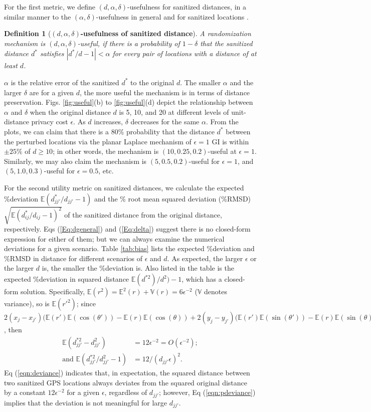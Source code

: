 \documentclass[10pt,journal,compsoc]{IEEEtran}
\newtheorem{defn}{Definition}
\newcommand{\E}{\mathbb{E}}
\newcommand{\V}{\mathbb{V}}
\begin{document}
For the first metric,  we define $(d,\alpha,\delta)$-usefulness for sanitized distances, in a similar manner   to the $(\alpha,\delta)$-usefulness in general \cite{blum} and for sanitized locations \cite{andres2013geo}.
\begin{defn}[\textbf{$(d,\alpha,\delta)$-usefulness of sanitized distance}] A randomization mechanism is $(d,\alpha,\delta)$-useful, if there is a probability of $1-\delta$ that  the sanitized distance $d^*$ satisfies $|d^*\!/d-1|<\alpha$ for every pair of locations with a distance of at least $d$.
\end{defn}\vspace{-3pt}
$\alpha$ is the relative error of the sanitized $d^*$ to the original $d$.  The smaller $\alpha$ and the larger $\delta$ are for a given $d$, the more useful the mechanism is in terms of distance preservation. Figs. \ref{fig:useful}(b) to \ref{fig:useful}(d) depict the relationship  between $\alpha$ and $\delta$ when the original distance $d$ is 5, 10, and 20 at different levels of unit-distance privacy cost $\epsilon$. As $d$ increases, $\delta$ decreases for the same $\alpha$. From the plots, we can claim that there is a 80\% probability that the distance $d^*$ between the perturbed locations via the planar Laplace mechanism of $\epsilon=1$ GI is within $\pm 25\%$ of $d\ge10$; in other words, the mechanism is $(10,  0.25, 0.2)$-useful at $\epsilon=1$. Similarly, we may also claim the mechanism is  $(5, 0.5, 0.2)$-useful for $\epsilon=1$, and $(5, 1.0, 0.3)$-useful for $\epsilon=0.5$, etc.


For the second utility  metric on sanitized distances, we calculate the expected \%deviation  $\E(d^*_{jj'}/d_{jj'}\!-\!1)$  and the \% root mean squared deviation (\%RMSD) $\sqrt{\E(d^*_{ij}/d_{ij}\!-\!1)^2}$ of the  sanitized distance from the original distance, respectively. Eqs (\ref{Eq:dgeneral}) and (\ref{Eq:delta}) suggest there is no closed-form expression for either of them; but we can always examine the numerical deviations for a given scenario. Table \ref{tab:bias} lists the expected \%deviation and \%RMSD in distance for different scenarios of $\epsilon$ and $d$.  As expected, the larger $\epsilon$ or the larger $d$ is, the smaller the \%deviation is.  Also listed in the table is the  expected \%deviation in squared distance  $\E(d^{*2})/d^2)\!-\!1$, which has a closed-form solution.  Specifically, $\E(r^2)=\E^2(r)+\V(r)=6\epsilon^{-2}$ ($\V$ denotes variance), so is $\E(r'^2)$; since $2(x_j-x_{j'})(\E(r')\E(\cos(\theta'))-\E(r)\E(\cos(\theta))+2(y_j\!-\!y_{j'})(\E(r')\E(\sin(\theta'))\!-\!\E(r)\E(\sin(\theta))=0$, then  
\begin{align}
\E(d^{*2}_{jj'}-d^2_{jj'})&= 12\epsilon^{-2}=O(\epsilon^{-2});\label{eqn:deviance}\\
\mbox{and } \E(d^{*2}_{jj'}/d^2_{jj'}-1)&= 12/(d_{jj'}\epsilon)^{2}. \label{eqn:pdeviance}
\end{align}
Eq (\ref{eqn:deviance}) indicates that, in expectation, the squared distance between two sanitized GPS locations always deviates from the squared original distance by a constant $12\epsilon^{-2}$ for a given $\epsilon$, regardless of $d_{jj'}$; however, Eq (\ref{eqn:pdeviance}) implies that the deviation is not meaningful for large $d_{jj'}$.
\end{document}
